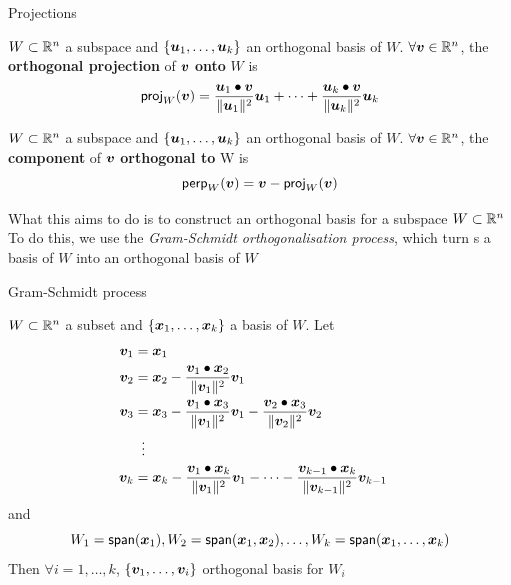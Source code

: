 \documentclass[aspectratio=169]{beamer}\usepackage[]{graphicx}\usepackage[]{xcolor}
\begin{document}
\begin{frame}{Projections}
	\begin{definition}
	$W\subset\mathbb{R}^n$ a subspace and $\{\bm{u}_1,\ldots,\bm{u}_k\}$ an orthogonal basis of $W$. $\forall\bm{v}\in\mathbb{R}^n$, the \textbf{orthogonal projection} of $\bm{v}$ \textbf{onto} $W$ is
	\[
	\mathsf{proj}_W(\bm{v}) =
	\frac{\bm{u}_1\bullet\bm{v}}{\|\bm{u}_1\|^2}\bm{u}_1
	+\cdots+
	\frac{\bm{u}_k\bullet\bm{v}}{\|\bm{u}_k\|^2}\bm{u}_k
	\]  
	\end{definition}
	\vfill
	\begin{definition}
	$W\subset\mathbb{R}^n$ a subspace and $\{\bm{u}_1,\ldots,\bm{u}_k\}$ an orthogonal basis of $W$. $\forall\bm{v}\in\mathbb{R}^n$, the \textbf{component} of  $\bm{v}$ \textbf{orthogonal to} W is
	\[
	\mathsf{perp}_W(\bm{v})=\bm{v}-\mathsf{proj}_W(\bm{v})
	\]
	\end{definition}	
	\end{frame}
	
	
	\begin{frame}
	What this aims to do is to construct an orthogonal basis for a subspace $W\subset\mathbb{R}^n$
	\vfill
	To do this, we use the \emph{Gram-Schmidt orthogonalisation process}, which turn s a basis of $W$ into an orthogonal basis of $W$
	\end{frame}
	
	\begin{frame}{Gram-Schmidt process}
	\begin{theorem}
	$W\subset\mathbb{R}^n$ a subset and $\{\bm{x}_1,\ldots,\bm{x}_k\}$ a basis of $W$. Let
	\begin{align*}
	\bm{v}_1 &= \bm{x}_1 \\
	\bm{v}_2 &= \bm{x}_2 -\frac{\bm{v}_1\bullet\bm{x}_2}{\|\bm{v}_1\|^2}\bm{v}_1 \\
	\bm{v}_3 &= \bm{x}_3 -\frac{\bm{v}_1\bullet\bm{x}_3}{\|\bm{v}_1\|^2}\bm{v}_1 -\frac{\bm{v}_2\bullet\bm{x}_3}{\|\bm{v}_2\|^2}\bm{v}_2 \\
	&\;\;\vdots & \\
	\bm{v}_k &= \bm{x}_k -\frac{\bm{v}_1\bullet\bm{x}_k}{\|\bm{v}_1\|^2}\bm{v}_1 -\cdots-\frac{\bm{v}_{k-1}\bullet\bm{x}_k}{\|\bm{v}_{k-1}\|^2}\bm{v}_{k-1}
	\end{align*}
	and
	\[
	W_1=\mathsf{span}(\bm{x}_1),W_2 = \mathsf{span}(\bm{x}_1,\bm{x}_2),\ldots,
	W_k = \mathsf{span}(\bm{x}_1,\ldots,\bm{x}_k)
	\]
	Then $\forall i=1,\ldots,k$, $\{\bm{v}_1,\ldots,\bm{v}_i\}$ orthogonal basis for $W_i$
	\end{theorem}
	\end{frame}
	
	


\end{document}
